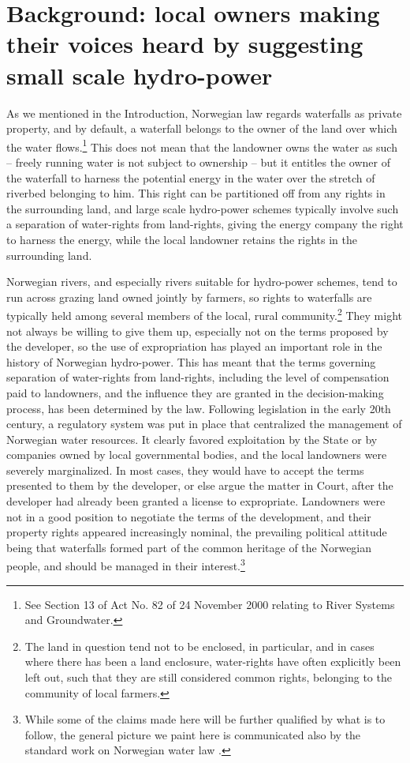 \section{Background: local owners making their voices heard by suggesting small scale hydro-power}\label{context}

As we mentioned in the Introduction, Norwegian law regards waterfalls as private property, and by default, a waterfall belongs to the owner of the land over which the water flows.\footnote{See Section 13 of Act No. 82 of 24 November 2000 relating to River Systems and Groundwater.} This does not mean that the landowner owns the water as such -- freely running water is not subject to ownership -- but it entitles the owner of the waterfall to harness the potential energy in the water over the stretch of riverbed belonging to him. This right can be partitioned off from any rights in the surrounding land, and large scale hydro-power schemes typically involve such a separation of water-rights from land-rights, giving the energy company the right to harness the energy, while the local landowner retains the rights in the surrounding land.

Norwegian rivers, and especially rivers suitable for hydro-power schemes, tend to run across grazing land owned jointly by farmers, so rights to waterfalls are typically held among several members of the local, rural community.\footnote{The land in question tend not to be enclosed, in particular, and in cases where there has been a land enclosure, water-rights have often explicitly been left out, such that they are still considered common rights, belonging to the community of local farmers.} They might not always be willing to give them up, especially not on the terms proposed by the developer, so the use of expropriation has played an important role in the history of Norwegian hydro-power. This has meant that the terms governing separation of water-rights from land-rights, including the level of compensation paid to landowners, and the influence they are granted in the decision-making process, has been determined by the law. Following legislation in the early 20th century, a regulatory system was put in place that centralized the management of Norwegian water resources. It clearly favored exploitation by the State or by companies owned by local governmental bodies, and the local landowners were severely marginalized. In most cases, they would have to accept the terms presented to them by the developer, or else argue the matter in Court, after the developer had already been granted a license to expropriate. Landowners were not in a good position to negotiate the terms of the development, and their property rights appeared increasingly nominal, the prevailing political attitude being that waterfalls formed part of the common heritage of the Norwegian people, and should be managed in their interest.\footnote{While some of the claims made here will be further qualified by what is to follow, the general picture we paint here is communicated also by the standard work on Norwegian water law \cite{falk}.}

